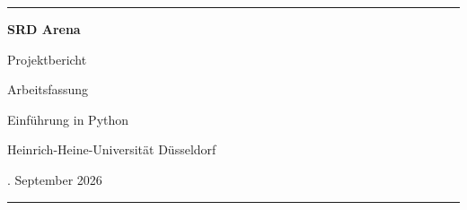 \documentclass[
  11pt,
  a4paper,
  parskip=half,
  headings=normal,
  numbers=noenddot
]{scrreprt}
\begin{document}
\hypersetup{pageanchor=false}

\begin{titlepage}
  \pagecolor{ArenaPaper}
  \color{ArenaInk}
  \centering
  \vspace*{2.4cm}
  {\color{ArenaGold}\rule{0.72\textwidth}{1.2pt}\par}
  \vspace{1.3cm}
  {\sffamily\bfseries\fontsize{34}{40}\selectfont SRD Arena\par}
  \vspace{0.45cm}
  {\sffamily\fontsize{19}{24}\selectfont Projektbericht\par}
  \vspace{0.8cm}
  {\sffamily\large Arbeitsfassung\par}
  \vfill
  {\sffamily\large Einführung in Python\par}
  \vspace{0.25cm}
  {\sffamily Heinrich-Heine-Universität Düsseldorf\par}
  \vspace{0.7cm}
  {. September 2026\par}
  \vspace{1.3cm}
  {\color{ArenaGold}\rule{0.72\textwidth}{1.2pt}\par}
\end{titlepage}
\nopagecolor
\hypersetup{pageanchor=true}

\tableofcontents
\clearpage
{}

\end{document}
